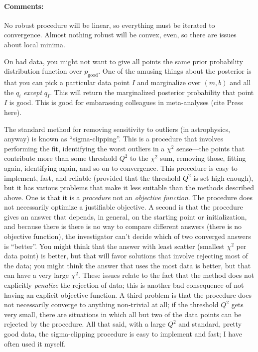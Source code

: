 \documentclass[12pt]{article}
\newcommand{\commentsname}{Comments}
\newcounter{problem}
\newenvironment{comments}{\paragraph{\commentsname:}}{}
\newcommand{\pgood}{p_{\mathrm{good}}}
\begin{document}
\begin{comments}
No robust procedure will be linear, so everything must be iterated to
convergence.  Almost nothing robust will be convex, even, so there are
issues about local minima.

On bad data, you might not want to give all points the same prior
probability distribution function over $\pgood$.  One of the amusing
things about the posterior is that you can pick a particular data
point $I$ and marginalize over $(m,b)$ and all the $q_i$ \emph{except}
$q_I$.  This will return the marginalized posterior probability that
point $I$ is good.  This is good for embarassing colleagues in
meta-analyses (cite Press here).

The standard method for removing sensitivity to outliers (in
astrophysics, anyway) is known as ``sigma-clipping''.  This is a
procedure that involves performing the fit, identifying the worst
outliers in a $\chi^2$ sense---the points that contribute more than
some threshold $Q^2$ to the $\chi^2$ sum, removing those, fitting
again, identifying again, and so on to convergence.  This procedure is
easy to implement, fast, and reliable (provided that the threshold
$Q^2$ is set high enough), but it has various problems that make it
less suitable than the methods described above.  One is that it is a
\emph{procedure} not an \emph{objective function}.  The procedure does
not necessarily optimize a justifiable objective.  A second is that
the procedure gives an answer that depends, in general, on the
starting point or initialization, and because there is there is no way
to compare different answers (there is no objective function), the
investigator can't decide which of two converged answers is
``better''.  You might think that the answer with least scatter
(smallest $\chi^2$ per data point) is better, but that will favor
solutions that involve rejecting most of the data; you might think the
answer that uses the most data is better, but that can have a very
large $\chi^2$.  These issues relate to the fact that the method does
not explicitly \emph{penalize} the rejection of data; this is another
bad consequence of not having an explicit objective function.  A third
problem is that the procedure does not necessarily converge to
anything non-trivial at all; if the threshold $Q^2$ gets very small,
there are situations in which all but two of the data points can be
rejected by the procedure.  All that said, with a large $Q^2$ and
standard, pretty good data, the sigma-clipping procedure is easy to
implement and fast; I have often used it myself.
\end{comments}
\end{document}
